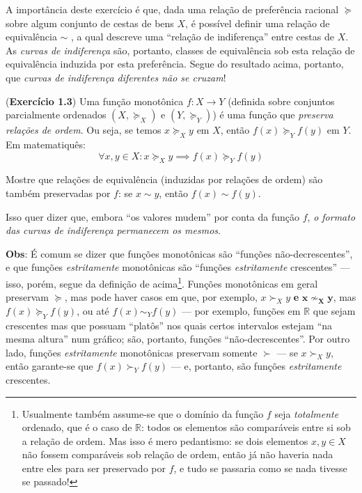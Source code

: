 \documentclass[12pt]{article}
\begin{document}
A importância deste exercício é que, dada uma relação de preferência
racional \(\succeq\) sobre algum conjunto de cestas de bens \(X\), é
possível definir uma relação de equivalência \(\sim\) , a qual descreve
uma ``relação de indiferença'' entre cestas de \(X\). As \emph{curvas de
indiferença} são, portanto, classes de equivalência sob esta relação de
equivalência induzida por esta preferência. Segue do resultado acima,
portanto, que \emph{curvas de indiferença diferentes não se cruzam}!

(\textbf{Exercício 1.3}) Uma função monotônica \(f:X \to Y\) (definida
sobre conjuntos parcialmente ordenados \((X, \succeq_{X})\) e
\((Y, \succeq_{Y})\)) é uma função que \emph{preserva relações de
ordem}. Ou seja, se temos \(x \succeq_{X} y\) em \(X\), então
\(f(x) \succeq_{Y} f(y)\) em \(Y\). Em matematiquês: \[
\forall x, y \in X: x \succeq_{X} y \implies f(x) \succeq_{Y} f(y)
\]

Mostre que relações de equivalência (induzidas por relações de ordem)
são também preservadas por \(f\): se \(x \sim y\), então
\(f(x) \sim f(y)\).

Isso quer dizer que, embora ``os valores mudem'' por conta da função
\(f\), \emph{o formato das curvas de indiferença permanecem os mesmos}.

\textbf{Obs}: É comum se dizer que funções monotônicas são ``funções
não-decrescentes'', e que funções \emph{estritamente} monotônicas são
``funções \emph{estritamente} crescentes'' --- isso, porém, segue da
definição de acima\footnote{Usualmente também assume-se que o domínio da
  função \(f\) seja \emph{totalmente} ordenado, que é o caso de
  \(\mathbb{R}\): todos os elementos são comparáveis entre si sob a
  relação de ordem. Mas isso é mero pedantismo: se dois elementos
  \(x, y \in X\) não fossem comparáveis sob relação de ordem, então já
  não haveria nada entre eles para ser preservado por \(f\), e tudo se
  passaria como se nada tivesse se passado!}. Funções monotônicas em
geral preservam \(\succeq\), mas pode haver casos em que, por exemplo,
\(x \succ_{X} y\) \textbf{e} \(\mathbf{x \nsim_{X} y}\), mas
\(f(x) \succeq_{Y} f(y)\), ou até \(f(x) \sim_{Y} f(y)\) --- por
exemplo, funções em \(\mathbb{R}\) que sejam crescentes mas que possuam
``platôs'' nos quais certos intervalos estejam ``na mesma altura'' num
gráfico; são, portanto, funções ``não-decrescentes''. Por outro lado,
funções \emph{estritamente} monotônicas preservam somente \(\succ\) ---
se \(x \succ_{X} y\), então garante-se que \(f(x) \succ_{Y} f(y)\) ---
e, portanto, são funções \emph{estritamente} crescentes.
\end{document}
